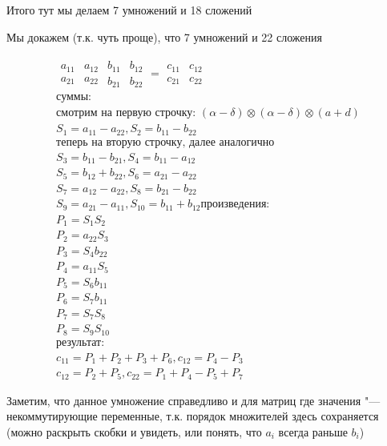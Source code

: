 Итого тут мы делаем 7 умножений и 18 сложений

Мы докажем (т.к. чуть проще), что 7 умножений и 22 сложения

\begin{gather*}
    \begin{matrix}
        a_{11} & a_{12} \\
        a_{21} & a_{22}
    \end{matrix}
    \begin{matrix}
        b_{11} & b_{12} \\
        b_{21} & b_{22}
    \end{matrix} = 
    \begin{matrix}
        c_{11} & c_{12} \\
        c_{21} & c_{22}
    \end{matrix}\\
    \text{суммы:} \\
    \text{смотрим на первую строчку: $(\alpha - \delta) \otimes (\alpha - \delta) \otimes (a + d)$} \\
    S_1 = a_{11} - a_{22}, S_2 = b_{11} - b_{22} \\
    \text{теперь на вторую строчку, далее аналогично} \\
    S_3 = b_{11} - b_{21}, S_4 = b_{11} - a_{12} \\
    S_5 = b_{12} + b_{22}, S_6 = a_{21} - a_{22} \\
    S_7 = a_{12} - a_{22}, S_8 = b_{21} - b_{22} \\
    S_9 = a_{21} - a_{11}, S_{10} = b_{11} + b_{12}
    \text{произведения:} \\
    P_1 = S_1 S_2    \\
    P_2 = a_{22} S_3 \\
    P_3 = S_4 b_{22} \\
    P_4 = a_{11} S_5 \\
    P_5 = S_6 b_{11} \\
    P_6 = S_7 b_{11} \\
    P_7 = S_7 S_8    \\
    P_8 = S_9 S_{10} \\
    \text{результат:} \\
    c_{11} = P_1 + P_2 + P_3 + P_6, c_{12} = P_4 - P_3 \\
    c_{12} = P_2 + P_5, c_{22} = P_1 + P_4 - P_5 + P_7
\end{gather*}

Заметим, что данное умножение справедливо и для матриц где значения "--- некоммутирующие 
переменные, т.к. порядок множителей здесь сохраняется 
(можно раскрыть скобки и увидеть, или понять, что $a_i$ всегда раньше $b_i$)

